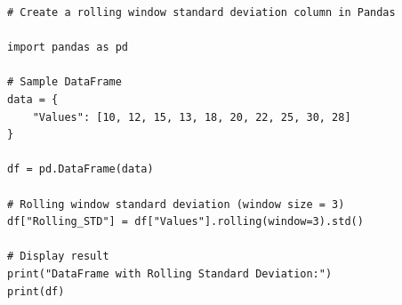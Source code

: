 \begin{verbatim}
# Create a rolling window standard deviation column in Pandas

import pandas as pd

# Sample DataFrame
data = {
    "Values": [10, 12, 15, 13, 18, 20, 22, 25, 30, 28]
}

df = pd.DataFrame(data)

# Rolling window standard deviation (window size = 3)
df["Rolling_STD"] = df["Values"].rolling(window=3).std()

# Display result
print("DataFrame with Rolling Standard Deviation:")
print(df)
\end{verbatim}